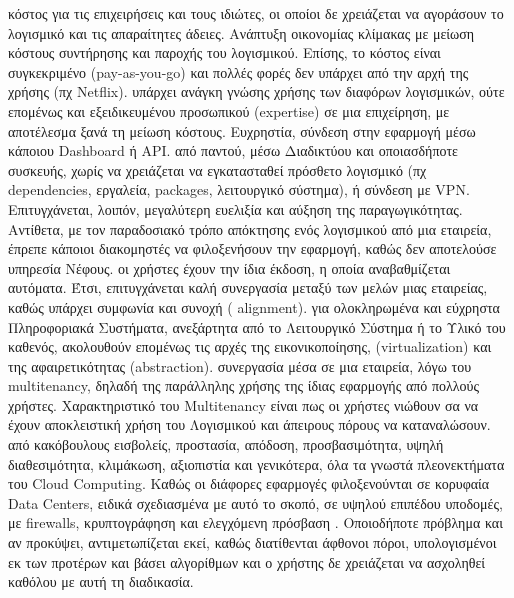 \documentclass{article}
\begin{document}
\begin{itemize}
     κόστος για τις επιχειρήσεις και τους ιδιώτες, οι οποίοι δε χρειάζεται να αγοράσουν το λογισμικό και τις απαραίτητες άδειες. Ανάπτυξη οικονομίας κλίμακας με μείωση κόστους συντήρησης και παροχής του λογισμικού. Επίσης, το κόστος είναι συγκεκριμένο (pay-as-you-go) και πολλές φορές δεν υπάρχει από την αρχή της χρήσης (πχ Netflix). 
     υπάρχει ανάγκη γνώσης χρήσης των διαφόρων λογισμικών, ούτε επομένως και εξειδικευμένου προσωπικού  (expertise)  σε μια επιχείρηση, με αποτέλεσμα ξανά τη μείωση κόστους. Ευχρηστία, σύνδεση στην εφαρμογή μέσω κάποιου Dashboard ή API.
     από παντού, μέσω Διαδικτύου και οποιασδήποτε συσκευής, χωρίς να χρειάζεται να εγκατασταθεί πρόσθετο λογισμικό (πχ dependencies, εργαλεία, packages, λειτουργικό σύστημα), ή σύνδεση με VPN. Επιτυγχάνεται, λοιπόν, μεγαλύτερη ευελιξία και αύξηση της παραγωγικότητας. Αντίθετα, με τον παραδοσιακό τρόπο απόκτησης ενός λογισμικού από μια εταιρεία, έπρεπε κάποιοι διακομηστές να φιλοξενήσουν την εφαρμογή, καθώς δεν αποτελούσε υπηρεσία Νέφους.
     οι χρήστες έχουν την ίδια έκδοση, η οποία αναβαθμίζεται αυτόματα. Έτσι, επιτυγχάνεται καλή συνεργασία μεταξύ των μελών μιας εταιρείας, καθώς υπάρχει συμφωνία και συνοχή ( alignment).
     για ολοκληρωμένα και εύχρηστα Πληροφοριακά Συστήματα, ανεξάρτητα από το Λειτουργικό Σύστημα ή το Υλικό του καθενός, ακολουθούν επομένως τις αρχές της εικονικοποίησης, (virtualization) και της αφαιρετικότητας (abstraction).
     συνεργασία μέσα σε μια εταιρεία, λόγω του multitenancy, δηλαδή της παράλληλης χρήσης της ίδιας εφαρμογής από πολλούς χρήστες. Χαρακτηριστικό του Multitenancy είναι πως οι χρήστες νιώθουν σα να έχουν αποκλειστική χρήση του Λογισμικού και άπειρους πόρους να καταναλώσουν.
     από κακόβουλους εισβολείς, προστασία, απόδοση, προσβασιμότητα, υψηλή διαθεσιμότητα, κλιμάκωση, αξιοπιστία και γενικότερα, όλα τα γνωστά πλεονεκτήματα του Cloud Computing. Καθώς οι διάφορες εφαρμογές φιλοξενούνται σε κορυφαία Data Centers, ειδικά σχεδιασμένα με αυτό το σκοπό, σε υψηλού επιπέδου υποδομές, με firewalls, κρυπτογράφηση και ελεγχόμενη πρόσβαση . Οποιοδήποτε πρόβλημα και αν προκύψει, αντιμετωπίζεται εκεί, καθώς διατίθενται άφθονοι πόροι, υπολογισμένοι εκ των προτέρων και βάσει αλγορίθμων και ο χρήστης δε χρειάζεται να ασχοληθεί καθόλου με αυτή τη διαδικασία.

\end{itemize}
\end{document}
